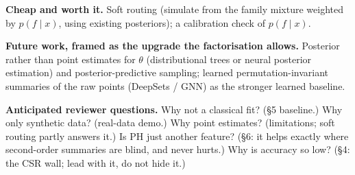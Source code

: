 \documentclass[11pt]{article}
\begin{document}
\textbf{Cheap and worth it.} Soft routing (simulate from the family mixture weighted by $p(f\mid x)$, using existing
posteriors); a calibration check of $p(f\mid x)$.

\textbf{Future work, framed as the upgrade the factorisation allows.} Posterior rather than point estimates for $\theta$
(distributional trees or neural posterior estimation) and posterior-predictive sampling; learned permutation-invariant
summaries of the raw points (DeepSets / GNN) as the stronger learned baseline.

\textbf{Anticipated reviewer questions.} Why not a classical fit? (\S5 baseline.) Why only synthetic data? (real-data demo.)
Why point estimates? (limitations; soft routing partly answers it.) Is PH just another feature? (\S6: it helps exactly where
second-order summaries are blind, and never hurts.) Why is accuracy so low? (\S4: the CSR wall; lead with it, do not hide it.)
\end{document}
